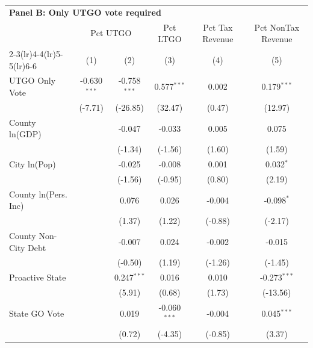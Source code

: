 \begingroup
\centering
\begin{tabular*}{\textwidth}{@{\extracolsep{\fill}}lccccc}
\multicolumn{5}{l}{\textbf{Panel B: Only UTGO vote required}}\\

\addlinespace
   \toprule
    & \multicolumn{2}{c}{Pct UTGO} & Pct LTGO & Pct Tax Revenue & Pct NonTax Revenue\\
   \cmidrule(lr){2-3}\cmidrule(lr){4-4}\cmidrule(lr){5-5}\cmidrule(lr){6-6}
                        & (1)            & (2)            & (3)            & (4)         & (5)\\  
   \midrule 
   UTGO Only Vote       & -0.630$^{***}$ & -0.758$^{***}$ & 0.577$^{***}$  & 0.002       & 0.179$^{***}$\\   
                        & (-7.71)       & (-26.85)      & (32.47)       & (0.47)     & (12.97)\\   
   County ln(GDP)       &                & -0.047         & -0.033         & 0.005       & 0.075\\   
                        &                & (-1.34)       & (-1.56)       & (1.60)     & (1.59)\\   
   City ln(Pop)         &                & -0.025         & -0.008         & 0.001       & 0.032$^{*}$\\   
                        &                & (-1.56)       & (-0.95)       & (0.80)     & (2.19)\\   
   County ln(Pers. Inc) &                & 0.076          & 0.026          & -0.004      & -0.098$^{*}$\\   
                        &                & (1.37)        & (1.22)        & (-0.88)    & (-2.17)\\   
   County Non-City Debt &                & -0.007         & 0.024          & -0.002      & -0.015\\   
                        &                & (-0.50)       & (1.19)        & (-1.26)    & (-1.45)\\   
   Proactive State      &                & 0.247$^{***}$  & 0.016          & 0.010       & -0.273$^{***}$\\   
                        &                & (5.91)        & (0.68)        & (1.73)     & (-13.56)\\   
   State GO Vote        &                & 0.019          & -0.060$^{***}$ & -0.004      & 0.045$^{***}$\\   
                        &                & (0.72)        & (-4.35)       & (-0.85)    & (3.37)\\   

\end{tabular*}
